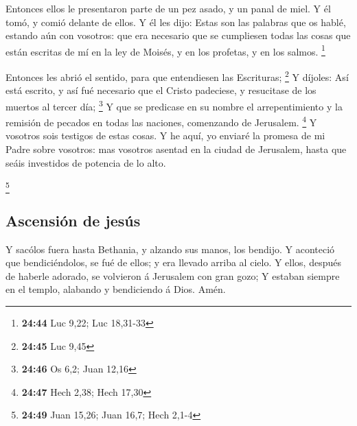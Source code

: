  Entonces ellos le presentaron parte de un pez asado, y un
panal de miel.  Y él tomó, y comió delante de ellos.
 Y él les dijo: Estas son las palabras que os hablé,
estando aún con vosotros: que era necesario que se cumpliesen todas las
cosas que están escritas de mí en la ley de Moisés, y en los profetas, y
en los salmos. \footnote{\textbf{24:44} Luc 9,22; Luc 18,31-33}

 Entonces les abrió el sentido, para que entendiesen las
Escrituras; \footnote{\textbf{24:45} Luc 9,45}  Y díjoles:
Así está escrito, y así fué necesario que el Cristo padeciese, y
resucitase de los muertos al tercer día; \footnote{\textbf{24:46} Os
  6,2; Juan 12,16}  Y que se predicase en su nombre el
arrepentimiento y la remisión de pecados en todas las naciones,
comenzando de Jerusalem. \footnote{\textbf{24:47} Hech 2,38; Hech 17,30}
 Y vosotros sois testigos de estas cosas.  Y
he aquí, yo enviaré la promesa de mi Padre sobre vosotros: mas vosotros
asentad en la ciudad de Jerusalem, hasta que seáis investidos de
potencia de lo alto.

\footnote{\textbf{24:49} Juan 15,26; Juan 16,7; Hech 2,1-4}

\hypertarget{ascensiuxf3n-de-jesuxfas}{%
\subsection{Ascensión de jesús}\label{ascensiuxf3n-de-jesuxfas}}

 Y sacólos fuera hasta Bethania, y alzando sus manos, los
bendijo.  Y aconteció que bendiciéndolos, se fué de ellos;
y era llevado arriba al cielo.  Y ellos, después de haberle
adorado, se volvieron á Jerusalem con gran gozo;  Y estaban
siempre en el templo, alabando y bendiciendo á Dios. Amén.
